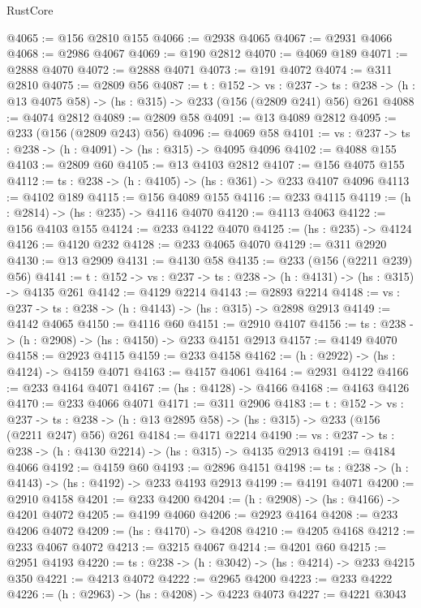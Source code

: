 \begin{lexlean}{RustCore}
\begin{coremodule}
@4065 := @156 @2810 @155
@4066 := @2938 @4065
@4067 := @2931 @4066
@4068 := @2986 @4067
@4069 := @190 @2812
@4070 := @4069 @189
@4071 := @2888 @4070
@4072 := @2888 @4071
@4073 := @191 @4072
@4074 := @311 @2810
@4075 := @2809 @56
@4087 := {t : @152} ->
  {vs : @237} ->
  {ts : @238} -> (h : @13 @4075 @58) -> (hs : @315) -> @233 (@156 (@2809 @241) @56) @261
@4088 := @4074 @2812
@4089 := @2809 @58
@4091 := @13 @4089 @2812
@4095 := @233 (@156 (@2809 @243) @56)
@4096 := @4069 @58
@4101 := {vs : @237} -> {ts : @238} -> (h : @4091) -> (hs : @315) -> @4095 @4096
@4102 := @4088 @155
@4103 := @2809 @60
@4105 := @13 @4103 @2812
@4107 := @156 @4075 @155
@4112 := {ts : @238} -> (h : @4105) -> (hs : @361) -> @233 @4107 @4096
@4113 := @4102 @189
@4115 := @156 @4089 @155
@4116 := @233 @4115
@4119 := (h : @2814) -> (hs : @235) -> @4116 @4070
@4120 := @4113 @4063
@4122 := @156 @4103 @155
@4124 := @233 @4122 @4070
@4125 := (hs : @235) -> @4124
@4126 := @4120 @232
@4128 := @233 @4065 @4070
@4129 := @311 @2920
@4130 := @13 @2909
@4131 := @4130 @58
@4135 := @233 (@156 (@2211 @239) @56)
@4141 := {t : @152} -> {vs : @237} -> {ts : @238} -> (h : @4131) -> (hs : @315) -> @4135 @261
@4142 := @4129 @2214
@4143 := @2893 @2214
@4148 := {vs : @237} -> {ts : @238} -> (h : @4143) -> (hs : @315) -> @2898 @2913
@4149 := @4142 @4065
@4150 := @4116 @60
@4151 := @2910 @4107
@4156 := {ts : @238} -> (h : @2908) -> (hs : @4150) -> @233 @4151 @2913
@4157 := @4149 @4070
@4158 := @2923 @4115
@4159 := @233 @4158
@4162 := (h : @2922) -> (hs : @4124) -> @4159 @4071
@4163 := @4157 @4061
@4164 := @2931 @4122
@4166 := @233 @4164 @4071
@4167 := (hs : @4128) -> @4166
@4168 := @4163 @4126
@4170 := @233 @4066 @4071
@4171 := @311 @2906
@4183 := {t : @152} ->
  {vs : @237} ->
  {ts : @238} -> (h : @13 @2895 @58) -> (hs : @315) -> @233 (@156 (@2211 @247) @56) @261
@4184 := @4171 @2214
@4190 := {vs : @237} -> {ts : @238} -> (h : @4130 @2214) -> (hs : @315) -> @4135 @2913
@4191 := @4184 @4066
@4192 := @4159 @60
@4193 := @2896 @4151
@4198 := {ts : @238} -> (h : @4143) -> (hs : @4192) -> @233 @4193 @2913
@4199 := @4191 @4071
@4200 := @2910 @4158
@4201 := @233 @4200
@4204 := (h : @2908) -> (hs : @4166) -> @4201 @4072
@4205 := @4199 @4060
@4206 := @2923 @4164
@4208 := @233 @4206 @4072
@4209 := (hs : @4170) -> @4208
@4210 := @4205 @4168
@4212 := @233 @4067 @4072
@4213 := @3215 @4067
@4214 := @4201 @60
@4215 := @2951 @4193
@4220 := {ts : @238} -> (h : @3042) -> (hs : @4214) -> @233 @4215 @350
@4221 := @4213 @4072
@4222 := @2965 @4200
@4223 := @233 @4222
@4226 := (h : @2963) -> (hs : @4208) -> @4223 @4073
@4227 := @4221 @3043

\end{coremodule}
\end{lexlean}
